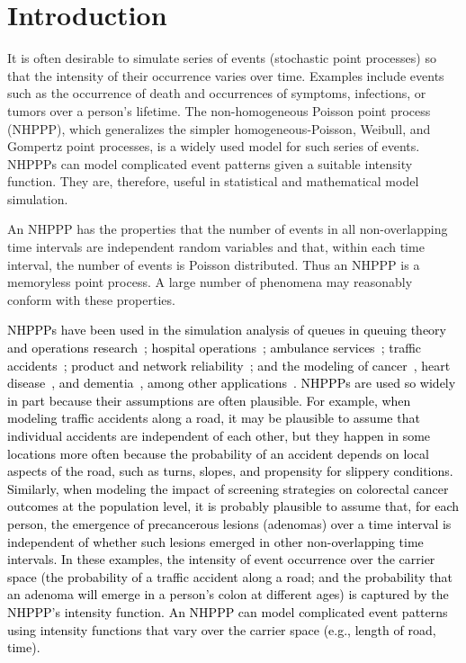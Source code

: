 \documentclass[10pt,letterpaper]{article}
\newcommand{\redtwo}[1]{\textcolor{black}{#1}}
\begin{document}
\newpage
\linenumbers
\section{Introduction} \label{sec:intro}

It is often desirable to simulate series of events (stochastic point processes) so that the intensity of their occurrence varies over time. Examples include events such as the occurrence of death and occurrences of symptoms, infections, or tumors over a person's lifetime. The non-homogeneous Poisson point process (NHPPP), which generalizes the simpler homogeneous-Poisson, Weibull, and Gompertz point processes, is a widely used model for such series of events. NHPPPs can model complicated event patterns given a suitable intensity function.  They are, therefore, useful in statistical and mathematical model simulation.

An NHPPP has the properties that the number of events in all non-overlapping time intervals are independent random variables and that, within each time interval, the number of events is Poisson distributed. Thus an NHPPP is a memoryless point process. A large number of phenomena may reasonably conform with these properties.%

\redtwo{NHPPPs have been used in the simulation analysis of queues in queuing theory and operations research~\cite{law2007simulation, luchak1956solution}; hospital operations~\cite{kim2014choosing}; ambulance services~\cite{yang2019simulation, zhou2015spatio}; traffic accidents~\cite{abdel2000modeling}; product and network reliability~\cite{thompson1981reliability}; and the modeling of cancer~\cite{england2023lung, rutter2010colorectal, jeon2008screening, tsokos2011NHPPPbreast}, heart disease~\cite{andreev2013discrete}, and dementia~\cite{getsios2010ad, mar2015dementia}, among other applications~\cite{zhang2018application}. NHPPPs are used so widely in part because their assumptions are often plausible. For example, when modeling traffic accidents along a road, it may be plausible to assume that individual accidents are independent of each other, but they happen in some locations more often because the probability of an accident depends on local aspects of the road, such as turns, slopes, and propensity for slippery conditions. Similarly, when modeling the impact of screening strategies on colorectal cancer outcomes at the population level, it is probably plausible to assume that, for each person, the emergence of precancerous lesions (adenomas) over a time interval is independent of whether such lesions emerged in other non-overlapping time intervals. In these examples, the intensity of event occurrence over the carrier space (the probability of a traffic accident along a road; and the probability that an adenoma will emerge in a person's colon at different ages) is captured by the NHPPP's intensity function. An NHPPP can model complicated event patterns using intensity functions that vary over the carrier space (e.g., length of road, time).}
\end{document}
